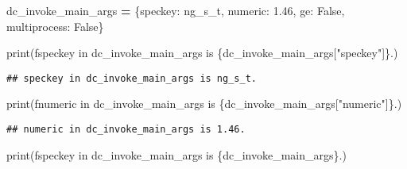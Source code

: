 \documentclass[
]{book}
\newenvironment{Shaded}{\begin{snugshade}}{\end{snugshade}}
\newcommand{\BuiltInTok}[1]{#1}
\newcommand{\FloatTok}[1]{\textcolor[rgb]{0.00,0.00,0.81}{#1}}
\newcommand{\NormalTok}[1]{#1}
\newcommand{\OperatorTok}[1]{\textcolor[rgb]{0.81,0.36,0.00}{\textbf{#1}}}
\newcommand{\SpecialCharTok}[1]{\textcolor[rgb]{0.00,0.00,0.00}{#1}}
\newcommand{\SpecialStringTok}[1]{\textcolor[rgb]{0.31,0.60,0.02}{#1}}
\newcommand{\StringTok}[1]{\textcolor[rgb]{0.31,0.60,0.02}{#1}}
\newcommand{\VariableTok}[1]{\textcolor[rgb]{0.00,0.00,0.00}{#1}}
\begin{document}
\begin{Shaded}
\begin{Highlighting}[]
\NormalTok{dc\_invoke\_main\_args }\OperatorTok{=}\NormalTok{ \{}\StringTok{\textquotesingle{}speckey\textquotesingle{}}\NormalTok{: }\StringTok{\textquotesingle{}ng\_s\_t\textquotesingle{}}\NormalTok{,}
                       \StringTok{\textquotesingle{}numeric\textquotesingle{}}\NormalTok{: }\FloatTok{1.46}\NormalTok{,}
                       \StringTok{\textquotesingle{}ge\textquotesingle{}}\NormalTok{: }\VariableTok{False}\NormalTok{,}
                       \StringTok{\textquotesingle{}multiprocess\textquotesingle{}}\NormalTok{: }\VariableTok{False}\NormalTok{\}}
                       
\BuiltInTok{print}\NormalTok{(}\SpecialStringTok{f\textquotesingle{}speckey in dc\_invoke\_main\_args is }\SpecialCharTok{\{}\NormalTok{dc\_invoke\_main\_args[}\StringTok{"speckey"}\NormalTok{]}\SpecialCharTok{\}}\SpecialStringTok{.\textquotesingle{}}\NormalTok{)}
\end{Highlighting}
\end{Shaded}

\begin{verbatim}
## speckey in dc_invoke_main_args is ng_s_t.
\end{verbatim}

\begin{Shaded}
\begin{Highlighting}[]
\BuiltInTok{print}\NormalTok{(}\SpecialStringTok{f\textquotesingle{}numeric in dc\_invoke\_main\_args is }\SpecialCharTok{\{}\NormalTok{dc\_invoke\_main\_args[}\StringTok{"numeric"}\NormalTok{]}\SpecialCharTok{\}}\SpecialStringTok{.\textquotesingle{}}\NormalTok{)}
\end{Highlighting}
\end{Shaded}

\begin{verbatim}
## numeric in dc_invoke_main_args is 1.46.
\end{verbatim}

\begin{Shaded}
\begin{Highlighting}[]
\BuiltInTok{print}\NormalTok{(}\SpecialStringTok{f\textquotesingle{}speckey in dc\_invoke\_main\_args is }\SpecialCharTok{\{}\NormalTok{dc\_invoke\_main\_args}\SpecialCharTok{\}}\SpecialStringTok{.\textquotesingle{}}\NormalTok{)}
\end{Highlighting}
\end{Shaded}
\end{document}
